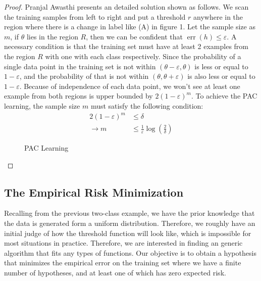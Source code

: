 \begin{proof}
Pranjal Awasthi presents an detailed solution shown as follows.\cite{Awasthi:1} We scan the training samples from left to right and put a threshold $r$ anywhere in the region where there is a change in label like (A) in figure 1. Let the sample size as $m$, if $\theta$ lies in the region $R$, then we can be confident that $\operatorname{err}(h) \leq \varepsilon$. A necessary condition is that the training set must have at least 2 examples from the region $R$ with one with each class respectively. Since the probability of a single data point in the training set is not within $(\theta - \varepsilon, \theta)$ is less or equal to $1-\varepsilon$, and the probability of that is not within $(\theta, \theta + \varepsilon)$ is also less or equal to $1-\varepsilon$. Because of independence of each data point, we won't see at least one example from both regions is upper bounded by $2(1-\varepsilon)^{m}$. To achieve the PAC learning, the sample size $m$ must satisfy the following condition:
\begin{equation*}
    \begin{aligned}
        2(1-\varepsilon)^{m} & \leq \delta \\
        \rightarrow m &\leq \frac{1}{\varepsilon}\log(\frac{2}{\delta})
    \end{aligned}
\end{equation*}


\begin{figure}[h] 
    \centering
    \hfill%
    \caption{PAC Learning}
\end{figure}
\end{proof}

\newpage
   
\subsection{The Empirical Risk Minimization}
Recalling from the previous two-class example, we have the prior knowledge that the data is generated form a uniform distribution. Therefore, we roughly have an initial judge of how the threshold function will look like, which is impossible for most situations in practice. Therefore, we are interested in finding an generic algorithm that fits any types of functions. Our objective is to obtain a hypothesis that minimizes the empirical error on the training set where we have a finite number of hypotheses, and at least one of which has zero expected risk. 

